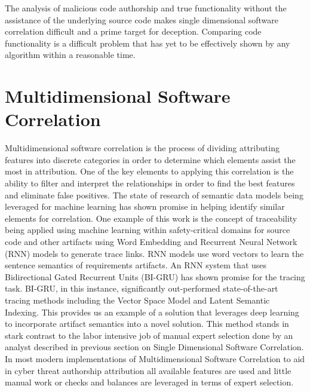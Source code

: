 \documentclass[12pt]{report}
\begin{document}
The analysis of malicious code authorship and true functionality without the assistance of the underlying source code makes single dimensional software correlation difficult and a prime target for deception.  Comparing code functionality is a difficult problem that has yet to be effectively shown by any algorithm within a reasonable time.

\section{Multidimensional Software Correlation}
Multidimensional software correlation is the process of dividing attributing features into discrete categories in order to determine which elements assist the most in attribution.  One of the key elements to applying this correlation is the ability to filter and interpret the relationships in order to find the best features and eliminate false positives.  The state of research of semantic data models being leveraged for machine learning has shown promise in helping identify similar elements for correlation.  One example of this work is the concept of traceability being applied using machine learning within safety-critical domains for source code and other artifacts using Word Embedding and Recurrent Neural Network (RNN) models to generate trace links.  RNN models use word vectors to learn the sentence semantics of requirements artifacts.  An RNN system that uses Bidirectional Gated Recurrent Units (BI-GRU) has shown promise for the tracing task.  \cite{saha2019integrating}  BI-GRU, in this instance, significantly out-performed state-of-the-art tracing methods including the Vector Space Model and Latent Semantic Indexing.   This provides us an example of a solution that leverages deep learning to incorporate artifact semantics into a novel solution. \cite{guo2017semantically}  This method stands in stark contrast to the labor intensive job of manual expert selection done by an analyst described in previous section on Single Dimensional Software Correlation.  In most modern implementations of Multidimensional Software Correlation to aid in cyber threat authorship attribution all available features are used and little manual work or checks and balances are leveraged in terms of expert selection. 
\end{document}
